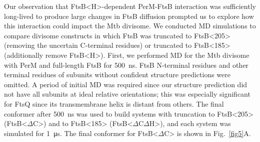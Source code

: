 \documentclass[twocolumn,pdflatex,sn-nature]{sn-jnl}%
\def\textsuperscript#1{<#1>}%
\newcommand\mtb{Mtb}
\newcommand\ftsbH{FtsB\textsuperscript{H}}
\newcommand\ftsbdCdH{FtsB\textsuperscript{$\Delta{}$C$\Delta{}$H}}
\newcommand\ftsbdC{FtsB\textsuperscript{$\Delta{}$C}}
\begin{document}
Our observation that \ftsbH{}-dependent PerM-FtsB interaction was sufficiently long-lived to produce large changes in FtsB diffusion prompted us to explore how this interaction could impact the \mtb{} divisome.
We conducted MD simulations to compare divisome constructs in which FtsB was truncated to FtsB\textsuperscript{205} (removing the uncertain C-terminal residues) or truncated to FtsB\textsuperscript{185} (additionally remove \ftsbH{}).
First, we performed MD for the \mtb{} divisome with PerM and full-length FtsB for \qty{500}{\ns}. FtsB N-terminal residues and other terminal residues of subunits without confident structure predictions were omitted.
A period of initial MD was required since our structure prediction did not have all subunits at ideal relative orientations; this was especially significant for FtsQ since its transmembrane helix is distant from others.
The final conformer after \qty{500}{\ns} was used to build systems with truncation to FtsB\textsuperscript{205} (\ftsbdC{}) and to FtsB\textsuperscript{185} (\ftsbdCdH{}), and each system was simulated for \qty{1}{\us}.
The final conformer for \ftsbdC{} is shown in Fig.~\ref{fig5}A.
\end{document}
